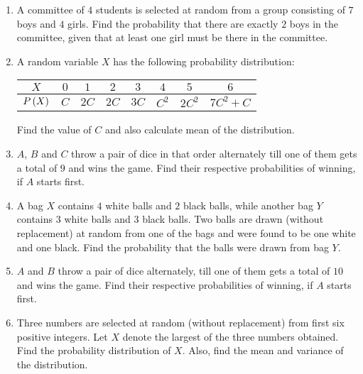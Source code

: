 \begin{enumerate}
\item A committee of $4$ students is selected at random from a group consisting of $7$ boys and $4$ girls. Find the probability that there are exactly $2$ boys in the committee, given that at least one girl must be there in the committee.
\item A random variable $X$ has the following probability distribution:
	\begin{center}
	\begin{tabular}{|c|c|c|c|c|c|c|c|}
	\hline
	$X$ & $0$ & $1$ & $2$ & $3$ & $4$ & $5$ & $6$\\
	\hline
	$P\left(X\right)$ & $C$ & $2C$ & $2C$ & $3C$ & $C^2$ & $2C^2$ & $7C^2+C$\\
	\hline
	\end{tabular}
	\end{center}
Find the value of $C$ and also calculate mean of the distribution.
\item $A$, $B$ and $C$ throw a pair of dice in that order alternately till one of them gets a total of $9$ and wins the game. Find their respective probabilities of winning, if $A$ starts first.

\item A bag $X$ contains $4$ white balls and $2$ black balls, while another bag $Y$ contains $3$ white balls and $3$ black balls. Two balls are drawn (without replacement) at random from one of the bags and were found to be one white and one black. Find the probability that the balls were drawn from bag $Y$.

\item $A$ and $B$ throw a pair of dice alternately, till one of them gets a total of $10$ and wins the game. Find their respective probabilities of winning, if $A$ starts first.

\item Three numbers are selected at random (without replacement) from first six positive integers. Let $X$ denote the largest of the three numbers obtained. Find the probability distribution of $X$. Also, find the mean and variance of the distribution.

\end{enumerate}
